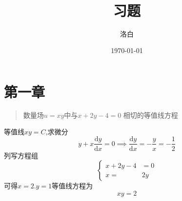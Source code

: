 \documentclass[twocolumn]{ctexart}
\title{习题}
\author{洛白}
\date{\today}
\begin{document}
\maketitle
\newpage

\renewcommand{\baselinestretch}{1.35}
\tableofcontents
\newpage

\setlength{\parskip}{0em}
\renewcommand{\baselinestretch}{1.53}


\section{第一章}
\begin{quote}
{\qquad{}\ccwd\kaishu{}
数量场$u=xy$中与$x+2y-4=0$ 相切的等值线方程
}
\end{quote}
等值线$xy=C$,求微分$$y+x\frac{\mathrm{d}{y}}{\mathrm{d}{x}}=0\implies \frac{\mathrm{d}{y}}{\mathrm{d}{x}}=-\frac{y}{x}=-\frac{1}{2}$$
列写方程组
$$
 \left\{ 
\begin{aligned}
 x+2y-4&=0\\
 x=&2y
 \end{aligned}
 \right.
$$
可得$x=2.y=1$等值线方程为
$$
xy=2
$$
\end{document}
